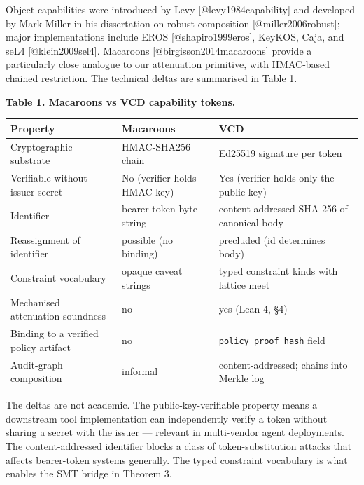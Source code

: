 Object capabilities were introduced by Levy {[}@levy1984capability{]}
and developed by Mark Miller in his dissertation on robust composition
{[}@miller2006robust{]}; major implementations include EROS
{[}@shapiro1999eros{]}, KeyKOS, Caja, and seL4 {[}@klein2009sel4{]}.
Macaroons {[}@birgisson2014macaroons{]} provide a particularly close
analogue to our attenuation primitive, with HMAC-based chained
restriction. The technical deltas are summarised in Table 1.

\textbf{Table 1. Macaroons vs VCD capability tokens.}

\begin{longtable}[]{@{}
  >{\raggedright\arraybackslash}p{}
  >{\raggedright\arraybackslash}p{}
  >{\raggedright\arraybackslash}p{}@{}}
\toprule\noalign{}
\begin{minipage}[b]{\linewidth}\raggedright
Property
\end{minipage} & \begin{minipage}[b]{\linewidth}\raggedright
Macaroons
\end{minipage} & \begin{minipage}[b]{\linewidth}\raggedright
VCD
\end{minipage} \\
\midrule\noalign{}
\endhead
\bottomrule\noalign{}
\endlastfoot
Cryptographic substrate & HMAC-SHA256 chain & Ed25519 signature per
token \\
Verifiable without issuer secret & No (verifier holds HMAC key) & Yes
(verifier holds only the public key) \\
Identifier & bearer-token byte string & content-addressed SHA-256 of
canonical body \\
Reassignment of identifier & possible (no binding) & precluded (id
determines body) \\
Constraint vocabulary & opaque caveat strings & typed constraint kinds
with lattice meet \\
Mechanised attenuation soundness & no & yes (Lean 4, §4) \\
Binding to a verified policy artifact & no &
\texttt{policy\_proof\_hash} field \\
Audit-graph composition & informal & content-addressed; chains into
Merkle log \\
\end{longtable}

The deltas are not academic. The public-key-verifiable property means a
downstream tool implementation can independently verify a token without
sharing a secret with the issuer --- relevant in multi-vendor agent
deployments. The content-addressed identifier blocks a class of
token-substitution attacks that affects bearer-token systems generally.
The typed constraint vocabulary is what enables the SMT bridge in
Theorem 3.

